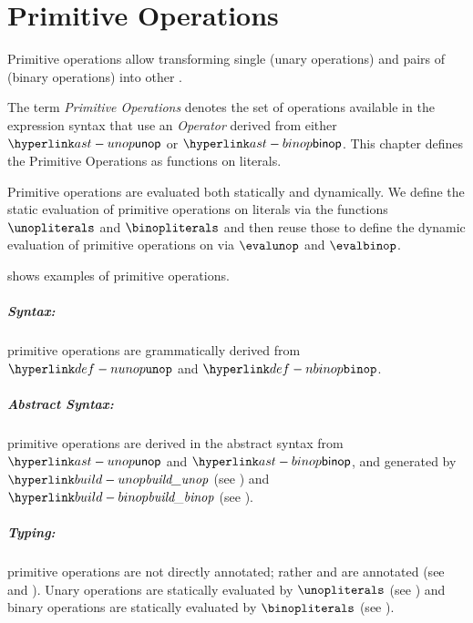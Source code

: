 \chapter{Primitive Operations\label{chap:PrimitiveOperations}}

Primitive operations allow transforming single \nativevaluesterm{} (unary operations)
and pairs of \nativevaluesterm{} (binary operations) into other \nativevaluesterm{}.


The term \emph{Primitive Operations} denotes the set of operations available
in the expression syntax that use an \emph{Operator} derived from either
$\unop$ or $\binop$.
This chapter defines the Primitive Operations as functions on literals.

Primitive operations are evaluated both statically and dynamically.
We define the static evaluation of primitive operations on literals
via the functions $\unopliterals$ and $\binopliterals$ and then reuse
those to define the dynamic evaluation of primitive operations
on \nativevaluesterm{} via $\evalunop$ and $\evalbinop$.

 shows examples of primitive operations.

\ChapterOutline

\paragraph{Syntax:} primitive operations are grammatically derived from $\Nunop$ and $\Nbinop$.

\paragraph{Abstract Syntax:} primitive operations are derived in the abstract syntax from $\unop$
  and $\binop$, and generated by $\buildunop$ (see )
  and $\buildbinop$ (see ).

\paragraph{Typing:} primitive operations are not directly annotated; rather \unopexpressionsterm{}
  and \binopexpressionsterm{} are annotated (see  and ).
  Unary operations are statically evaluated by $\unopliterals$
  (see ) and binary operations are statically evaluated
  by $\binopliterals$
  (see ).

